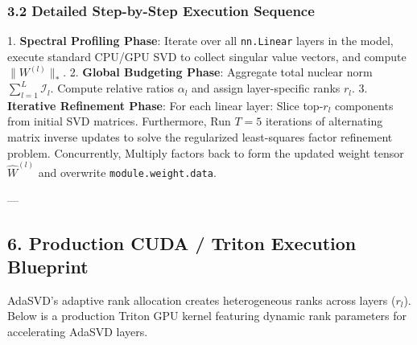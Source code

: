 \subsubsection{3.2 Detailed Step-by-Step Execution Sequence}
1. \textbf{Spectral Profiling Phase}: Iterate over all \texttt{nn.Linear} layers in the model, execute standard CPU/GPU SVD to collect singular value vectors, and compute $\|W^{(l)}\|_*$.
2. \textbf{Global Budgeting Phase}: Aggregate total nuclear norm $\sum_{l=1}^L \mathcal{I}_l$. Compute relative ratios $\alpha_l$ and assign layer-specific ranks $r_l$.
3. \textbf{Iterative Refinement Phase}: For each linear layer:
Slice top-$r_l$ components from initial SVD matrices. Furthermore, Run $T = 5$ iterations of alternating matrix inverse updates to solve the regularized least-squares factor refinement problem. Concurrently, Multiply factors back to form the updated weight tensor $\hat{W}^{(l)}$ and overwrite \texttt{module.weight.data}.


---

\subsection{6. Production CUDA / Triton Execution Blueprint}
AdaSVD's adaptive rank allocation creates heterogeneous ranks across layers ($r_l$). Below is a production Triton GPU kernel featuring dynamic rank parameters for accelerating AdaSVD layers.


